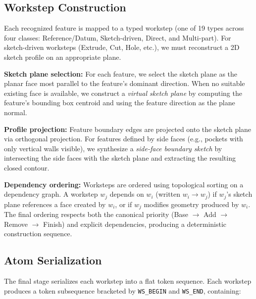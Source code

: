 \documentclass{styles/svproc}
\begin{document}
\subsection{Workstep Construction}
\label{sec:worksteps}
Each recognized feature is mapped to a typed workstep (one of 19 types across four classes: Reference/Datum, Sketch-driven, Direct, and Multi-part). For sketch-driven worksteps (Extrude, Cut, Hole, etc.), we must reconstruct a 2D sketch profile on an appropriate plane.

\textbf{Sketch plane selection:} For each feature, we select the sketch plane as the planar face most parallel to the feature's dominant direction. When no suitable existing face is available, we construct a \emph{virtual sketch plane} by computing the feature's bounding box centroid and using the feature direction as the plane normal.

\textbf{Profile projection:} Feature boundary edges are projected onto the sketch plane via orthogonal projection. For features defined by side faces (e.g., pockets with only vertical walls visible), we synthesize a \emph{side-face boundary sketch} by intersecting the side faces with the sketch plane and extracting the resulting closed contour.

\textbf{Dependency ordering:} Worksteps are ordered using topological sorting on a dependency graph. A workstep $w_j$ depends on $w_i$ (written $w_i \to w_j$) if $w_j$'s sketch plane references a face created by $w_i$, or if $w_j$ modifies geometry produced by $w_i$. The final ordering respects both the canonical priority (Base $\to$ Add $\to$ Remove $\to$ Finish) and explicit dependencies, producing a deterministic construction sequence.

\subsection{Atom Serialization}
\label{sec:atoms}
The final stage serializes each workstep into a flat token sequence. Each workstep produces a token subsequence bracketed by \texttt{WS\_BEGIN} and \texttt{WS\_END}, containing:
\end{document}

